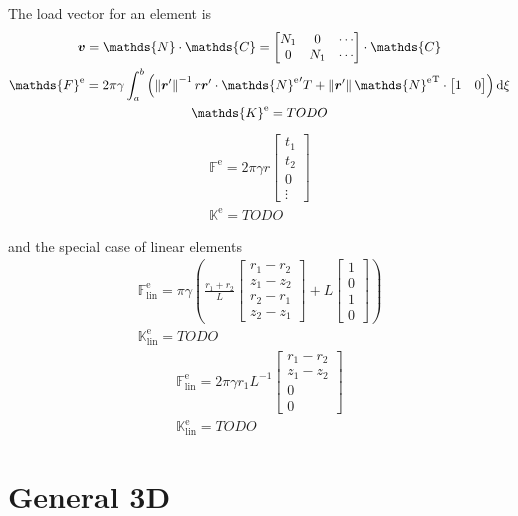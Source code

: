 \documentclass[a4paper,11pt]{article}
\renewcommand{\to}[1]{\text{\boldmath $#1$}} %
\newcommand{\uv}[1]{\mathds{#1}}
\newcommand{\um}[1]{\mathds{#1}}
\newcommand{\intd}[1]{\mathrm{d}#1}
\newcommand{\norm}[1]{\left\lVert{#1}\right\rVert}
\newcommand{\T}{\mathrm{T}}
\newcommand{\element}{\mathrm{e}}
\newcommand{\linear}{\mathrm{lin}}
\begin{document}
The load vector for an element is
\begin{gather}
 \to v = \um{N}\cdot\um{C} = \begin{bmatrix}N_1 & 0 & \cdots\\ 0 & N_1 & \cdots \end{bmatrix}\cdot \um{C}\\
 \uv F^\element = 2\pi \gamma \int_a^b \left(\norm{\to r'}^{-1}r\to r'\cdot{\um N^\element}'^\T + \norm{\to r'}{\um N^\element}^\T\cdot\begin{bmatrix}1&0\end{bmatrix}\right) \intd\xi\\
 \um K^\element = TODO
\end{gather}
\begin{gather}
 \uv F^\element = 2\pi \gamma r \begin{bmatrix}t_1\\t_2\\0\\\vdots\end{bmatrix}\\
 \um K^\element = TODO
\end{gather}

and the special case of linear elements
\begin{gather}
 \uv F^\element_\linear = \pi \gamma \left(\frac{r_1+r_2}{L}\begin{bmatrix}r_1-r_2\\z_1-z_2\\r_2-r_1\\z_2-z_1\end{bmatrix} + L\begin{bmatrix}1\\0\\1\\0\end{bmatrix}\right)\\
 \um K^\element_\linear = TODO
\end{gather}
\begin{gather}
 \uv F^\element_\linear = 2\pi \gamma r_1 L^{-1} \begin{bmatrix}r_1-r_2\\z_1-z_2\\0\\0\end{bmatrix}\\
 \um K^\element_\linear = TODO
\end{gather}


\section{General 3D}
\end{document}
